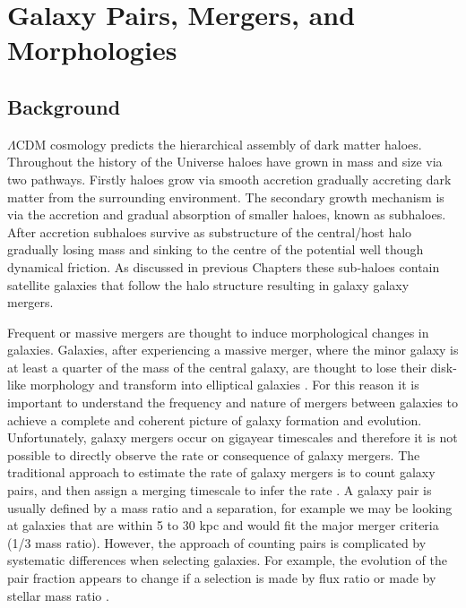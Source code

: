 
\chapter{Galaxy Pairs, Mergers, and Morphologies} 
\label{Chapter:GalPairs}

\section{Background}

$\Lambda$CDM cosmology predicts the hierarchical assembly of dark matter haloes.
Throughout the history of the Universe haloes have grown in mass and size via two pathways. 
Firstly haloes grow via smooth accretion gradually accreting dark matter from the surrounding environment. 
The secondary growth mechanism is via the accretion and gradual absorption of smaller haloes, known as subhaloes. 
After accretion subhaloes survive as substructure of the central/host halo gradually losing mass and sinking to the centre of the potential well though dynamical friction. As discussed in previous Chapters these sub-haloes contain satellite galaxies that follow the halo structure resulting in galaxy galaxy mergers.

Frequent or massive mergers are thought to induce morphological changes in galaxies. 
Galaxies, after experiencing a massive merger, where the minor galaxy is at least a quarter of the mass of the central galaxy, are thought to lose their disk-like morphology and transform into elliptical galaxies \citep{Negroponte1983SimulationsGalaxies, DeLucia2006TheGalaxies}. 
For this reason it is important to understand the frequency and nature of mergers between galaxies to achieve a complete and coherent picture of galaxy formation and evolution. 
Unfortunately, galaxy mergers occur on gigayear timescales and therefore it is not possible to directly observe the rate or consequence of galaxy mergers. 
The traditional approach to estimate the rate of galaxy mergers is to count galaxy pairs, and then assign a merging timescale to infer the rate \citep{Conselice20033,Conselice2008TheField,Mundy2017A3.5,Duncan2019ObservationalFields}.
A galaxy pair is usually defined by a mass ratio and a separation, for example we may be looking at galaxies that are within 5 to 30 kpc and would fit the major merger criteria (1/3 mass ratio).
However, the approach of counting pairs is complicated by systematic differences when selecting galaxies. For example, the evolution of the pair fraction appears to change if a selection is made by flux ratio or made by stellar mass ratio \citep{Man2016RESOLVING03}.

